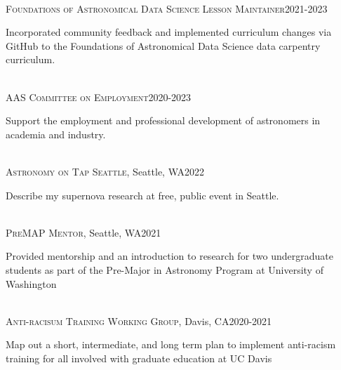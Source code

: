 \documentclass[10pt]{cv}
\begin{document}
\begin{llist}
\\
\textsc{Foundations of Astronomical Data Science Lesson Maintainer}\hfill 2021-2023\
\begin{minipage}[l]{0.7\textwidth}\vspace{0.15cm}
Incorporated community feedback and implemented curriculum changes via GitHub to the Foundations of Astronomical Data Science data carpentry curriculum. \\
\end{minipage}\vspace{0.15cm}
\\
\textsc{AAS Committee on Employment}\hfill 2020-2023\
\begin{minipage}[l]{0.7\textwidth}\vspace{0.15cm}
Support the employment and professional development of astronomers in academia and industry.\\
\end{minipage}\vspace{0.15cm}
\\
\textsc{Astronomy on Tap Seattle}, Seattle, WA\hfill 2022\\
\begin{minipage}[l]{0.7\textwidth}\vspace{0.15cm}
Describe my supernova research at free, public event in Seattle.\\
\end{minipage}\vspace{0.15cm}
\\
\textsc{PreMAP Mentor}, Seattle, WA\hfill 2021\\
\begin{minipage}[l]{0.7\textwidth}\vspace{0.15cm}
Provided mentorship and an introduction to research for two undergraduate students as part of the Pre-Major in Astronomy Program at University of Washington \\
\end{minipage}\vspace{0.15cm}
\\
\textsc{Anti-racisum Training Working Group}, Davis, CA\hfill 2020-2021\\
\begin{minipage}[l]{0.7\textwidth}\vspace{0.15cm}
Map out a short, intermediate, and long term plan to implement anti-racism training for all involved with graduate education at UC Davis \\
\end{minipage}\vspace{0.15cm}

\end{llist}
\end{document}
